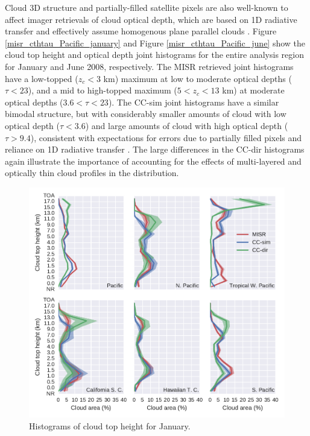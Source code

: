 Cloud 3D structure and partially-filled satellite pixels are also well-known to affect imager retrievals of cloud optical depth, which are based on 1D radiative transfer and effectively assume homogenous plane parallel clouds \citep{yang_and_digirolamo_2008, evans_et_al_2008}. Figure \ref{misr_cthtau_Pacific_january} and Figure \ref{misr_cthtau_Pacific_june} show the cloud top height and optical depth joint histograms for the entire analysis region for January and June 2008, respectively. The MISR retrieved joint histograms have a low-topped ($z_c < 3$ km) maximum at low to moderate optical depths ($\tau < 23$), and a mid to high-topped maximum ($5 < z_c < 13$ km) at moderate optical depths ($3.6 < \tau < 23$). The CC-sim joint histograms have a similar bimodal structure, but with considerably smaller amounts of cloud with low optical depth ($\tau < 3.6$) and large amounts of cloud with high optical depth ($\tau > 9.4$), consistent with expectations for errors due to partially filled pixels and reliance on 1D radiative transfer \citep{marchand_et_al_2010}. The large differences in the CC-dir histograms again illustrate the importance of accounting for the effects of multi-layered and optically thin cloud profiles in the  distribution.

\begin{figure}
\centering
\includegraphics[width=\columnwidth]{graphics/misr_cth_2008-01.pdf}
\caption{Histograms of cloud top height for January.}
\label{misr_cth_region_january}
\end{figure}

